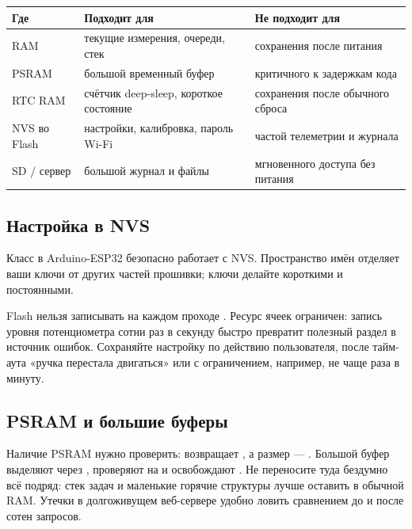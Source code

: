 \begin{center}\small
\begin{tabularx}{\textwidth}{@{}l X X@{}}
\toprule
Где & Подходит для & Не подходит для \\
\midrule
RAM & текущие измерения, очереди, стек & сохранения после питания \\
PSRAM & большой временный буфер & критичного к задержкам кода \\
RTC RAM & счётчик deep-sleep, короткое состояние & сохранения после обычного сброса \\
NVS во Flash & настройки, калибровка, пароль Wi-Fi & частой телеметрии и журнала \\
SD / сервер & большой журнал и файлы & мгновенного доступа без питания \\
\bottomrule
\end{tabularx}
\end{center}

\subsection{Настройка в NVS}

Класс  в Arduino-ESP32 безопасно работает с NVS. Пространство имён 
отделяет ваши ключи от других частей прошивки; ключи делайте короткими и постоянными.


\begin{caution}
Flash нельзя записывать на каждом проходе . Ресурс ячеек ограничен: запись уровня
потенциометра сотни раз в секунду быстро превратит полезный раздел в источник ошибок. Сохраняйте
настройку по действию пользователя, после тайм-аута «ручка перестала двигаться» или с ограничением,
например, не чаще раза в минуту.
\end{caution}

\subsection{PSRAM и большие буферы}

Наличие PSRAM нужно проверить:  возвращает , а размер ---
. Большой буфер выделяют через , проверяют на 
и освобождают . Не переносите туда бездумно всё подряд: стек задач и маленькие горячие
структуры лучше оставить в обычной RAM. Утечки в долгоживущем веб-сервере удобно ловить сравнением
 до и после сотен запросов.

